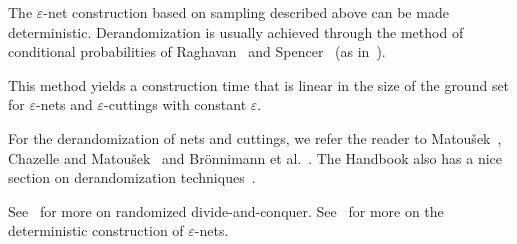 The
\(\varepsilon\)-net
construction based on sampling
described above can be made deterministic.
%
Derandomization is usually achieved through
the method of conditional probabilities of Raghavan~\cite{Rag88}
and Spencer~\cite{Spe94} (as in~\cite{C93}).

This method yields a construction time that is linear in the size of
the ground set for \(\varepsilon\)-nets and \(\varepsilon\)-cuttings with
constant \(\varepsilon\).

For the derandomization of nets and cuttings, we
refer the reader to Matou\v{s}ek~\cite{M95,M96}, Chazelle and
Matou\v{s}ek~\cite{CM96} and Brönnimann et al.~\cite{BCM99}.
%
The Handbook also has a nice section on derandomization
techniques~\cite[Section~40.6]{CMR04}.

See~\cite[Section~40.1]{CMR04} for more on randomized divide-and-conquer.
See~\cite[Section~40.7]{CMR04} for more on the deterministic construction of
\(\varepsilon\)-nets.
